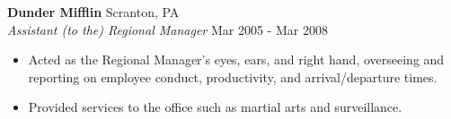 \textbf{Dunder Mifflin} \hfill Scranton, PA\\
\textit{Assistant (to the) Regional Manager} \hfill Mar 2005 - Mar 2008\\
\vspace*{-4pt}
\begin{itemize} \itemsep 1pt
	\item Acted as the Regional Manager's eyes, ears, and right hand, overseeing and reporting on employee conduct, productivity, and arrival/departure times.
	\item Provided services to the office such as martial arts and surveillance.
\end{itemize}

